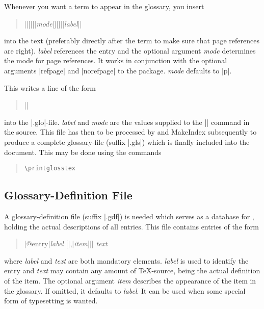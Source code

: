 \documentclass[draft,a4paper]{ltxdoc}
\newcommand{\MakeIndex}{{MakeIndex}}
\newcommand{\darg}[1]{{\itshape #1\/}}
\newcommand{\dopt}[1]{$[$#1$]$}
\begin{document}
Whenever you want a term to appear in the glossary, you insert
%
\begin{quote}
  |\glosstex|\dopt{|[|\darg{mode}|]|}|{|\darg{label}|}|
\end{quote}
%
into the text (preferably directly after the term to make sure that
page references are right). \darg{label} references the entry and the
optional argument \darg{mode} determines the mode for page references.
It works in conjunction with the optional arguments |refpage| and
|norefpage| to the package. \darg{mode} defaults to |p|.

This writes a line of the form
%
\begin{quote}
|\glosstexentry{|\darg{label}|}{|\darg{mode}|}{|\darg{page}|}|  
\end{quote}
%
into the |.glo|-file. \darg{label} and \darg{mode} are the
values supplied to the |\glosstex| command in the source. This file
has then to be processed by \GlossTeX{} and \MakeIndex{} subsequently
to produce a complete glossary-file (suffix |.gls|) which is finally
included into the document. This may be done using the commands
%
\begin{quote}
\begin{verbatim}
\printglosstex
\end{verbatim}
\end{quote}

\subsection{Glossary-Definition File}
A glossary-definition file (suffix |.gdf|) is needed which serves
as a database for \GlossTeX{}, holding the actual descriptions of all
entries. This file contains entries of the form
%
\begin{quote}
|@entry{|\darg{label }\dopt{|,|\darg{item}}|}| \darg{text}
\end{quote}
%
where \darg{label} and \darg{text} are both mandatory elements. \darg{label}
is used to identify the entry and \darg{text} may contain any amount
of \TeX{}-source, being the actual definition of the item. The
optional argument \darg{item} describes the appearance of the item in
the glossary. If omitted, it defaults to \darg{label}. It can be used
when some special form of typesetting is wanted.
\end{document}
